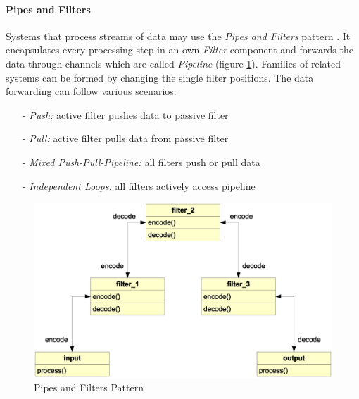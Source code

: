 %
%
%
%
%
%
%

\paragraph{Pipes and Filters}
\label{pipes_and_filters_heading}

Systems that process streams of data may use the \emph{Pipes and Filters}
pattern \cite{buschmann}. It encapsulates every processing step in an own
\emph{Filter} component and forwards the data through channels which are called
\emph{Pipeline} (figure \ref{pipesfilters_figure}). Families of related systems
can be formed by changing the single filter positions. The data forwarding can
follow various scenarios:

\begin{itemize}
    \item[-] \emph{Push:} active filter pushes data to passive filter
    \item[-] \emph{Pull:} active filter pulls data from passive filter
    \item[-] \emph{Mixed Push-Pull-Pipeline:} all filters push or pull data
    \item[-] \emph{Independent Loops:} all filters actively access pipeline
\end{itemize}

\begin{figure}[ht]
    \begin{center}
        \includegraphics[scale=0.3]{vector/pipesfilters.eps}
        \caption{Pipes and Filters Pattern}
        \label{pipesfilters_figure}
    \end{center}
\end{figure}
